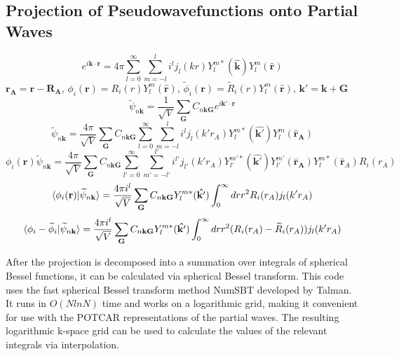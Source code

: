 \documentclass[12pt]{article}
\begin{document}
\subsection{Projection of Pseudowavefunctions onto Partial Waves}

\begin{equation}
e^{i\mathbf{k} \cdot \mathbf{r}} = 4\pi \sum_{l=0}^{\infty}\sum_{m=-l}^{l}
i^l j_l(kr)Y_l^{m*}(\mathbf{\hat{k}})Y_l^m(\mathbf{\hat{r}})
\label{eq:pwexp}
\end{equation}
$\mathbf{r_A} = \mathbf{r} - \mathbf{R_A}$, $\phi_i(\mathbf{r})=R_i(r)Y_l^m(\mathbf{\hat{r}})$,
$\widetilde{\phi}_i(\mathbf{r})=\widetilde{R}_i(r)Y_l^m(\mathbf{\hat{r}})$,
$\mathbf{k'}=\mathbf{k}+\mathbf{G}$\\
$$\widetilde{\psi}_{n\mathbf{k}}=\frac{1}{\sqrt{V}}\sum_{\mathbf{G}}
C_{n\mathbf{k}\mathbf{G}}e^{i\mathbf{k'}\cdot \mathbf{r}}$$
$$\widetilde{\psi}_{n\mathbf{k}}=\frac{4\pi}{\sqrt{V}}\sum_{\mathbf{G}}
C_{n\mathbf{k}\mathbf{G}}\sum_{l=0}^{\infty}\sum_{m=-l}^{l}
i^l j_l(k'r_A)Y_l^{m*}(\mathbf{\hat{k'}})Y_l^m(\mathbf{\hat{r}_A})$$
$$\phi_i(\mathbf{r})\widetilde{\psi}_{n\mathbf{k}}=\frac{4\pi}{\sqrt{V}}\sum_{\mathbf{G}}
C_{n\mathbf{k}\mathbf{G}}\sum_{l'=0}^{\infty}\sum_{m'=-l'}^{l'}
i^{l'} j_{l'}(k'r_A)Y_{l'}^{m'*}(\mathbf{\hat{k'}})Y_{l'}^{m'}(\mathbf{\hat{r}_A})
Y_l^{m*}(\mathbf{\hat{r}}_A)R_i(r_A)$$
$$\braket{\phi_i(\mathbf{r})|\widetilde{\psi}_{n\mathbf{k}}}=
\frac{4\pi i^l}{\sqrt{V}}\sum_{\mathbf{G}} C_{n\mathbf{k}\mathbf{G}}
Y_l^{m*}(\mathbf{\hat{k'}})\int_0^{\infty}drr^2R_i(r_A)j_l(k'r_A)$$
$$\braket{\phi_i-\widetilde{\phi}_i|\widetilde{\psi}_{n\mathbf{k}}}=
\frac{4\pi i^l}{\sqrt{V}}\sum_{\mathbf{G}} C_{n\mathbf{k}\mathbf{G}}
Y_l^{m*}(\mathbf{\hat{k'}})\int_0^{\infty}drr^2(R_i(r_A)-\widetilde{R}_i(r_A))j_l(k'r_A)$$

After the projection is decomposed into a summation over integrals of spherical
Bessel functions, it can be calculated via spherical Bessel transform. This code
uses the fast spherical Bessel transform method NumSBT developed by Talman.\cite{TALMAN}
It runs in $O(NlnN)$ time and works on a logarithmic grid, making it convenient for use with
the POTCAR representations of the partial waves. The resulting logarithmic k-space
grid can be used to calculate the values of the relevant integrals via interpolation.
\end{document}
